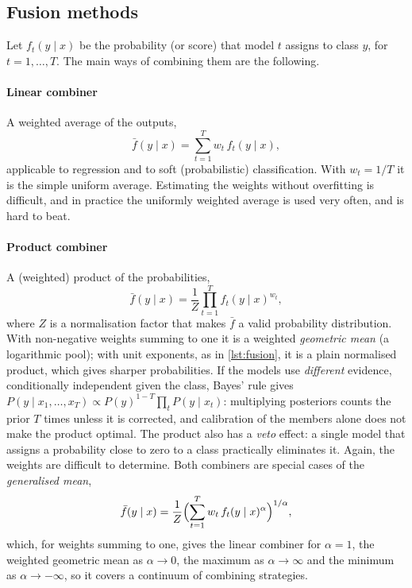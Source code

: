 \subsection{Fusion methods}

Let $f_t(y\mid x)$ be the probability (or score) that model $t$ assigns to class $y$, for
$t=1,\dots,T$. The main ways of combining them are the following.

\paragraph{Linear combiner} A weighted average of the outputs,
\begin{equation}\label{eq:linear}
  \bar f(y\mid x)=\sum_{t=1}^{T}w_t\,f_t(y\mid x),
\end{equation}
applicable to regression and to soft (probabilistic) classification. With $w_t=1/T$ it is the
simple uniform average. Estimating the weights without overfitting is difficult, and in
practice the uniformly weighted average is used very often, and is hard to beat.

\paragraph{Product combiner} A (weighted) product of the probabilities,
\begin{equation}\label{eq:product}
  \bar f(y\mid x)=\frac1Z\prod_{t=1}^{T}f_t(y\mid x)^{w_t},
\end{equation}
where $Z$ is a normalisation factor that makes $\bar f$ a valid probability distribution. With non-negative
weights summing to one it is a weighted \emph{geometric mean} (a logarithmic pool); with unit exponents, as in
\cref{lst:fusion}, it is a plain normalised product, which gives sharper probabilities. If the models
use \emph{different} evidence, conditionally independent given the class, Bayes' rule gives
$P(y\mid x_1,\dots,x_T)\propto P(y)^{1-T}\prod_tP(y\mid x_t)$: multiplying posteriors counts the prior $T$ times
unless it is corrected, and calibration of the members alone does not make the product optimal. The
product also has a \emph{veto} effect: a
single model that assigns a probability close to zero to a class practically eliminates it.
Again, the weights are difficult to determine. Both combiners are special cases of the
\emph{generalised mean},
\begin{equation}
  \bar f(y\mid x)=\frac1Z\Bigl(\sum_{t=1}^{T}w_t\,f_t(y\mid x)^{\alpha}\Bigr)^{1/\alpha},
\end{equation}
which, for weights summing to one, gives the linear combiner for $\alpha=1$, the weighted geometric mean as
$\alpha\to0$, the
maximum as $\alpha\to\infty$ and the minimum as $\alpha\to-\infty$, so it covers a continuum of combining strategies.

